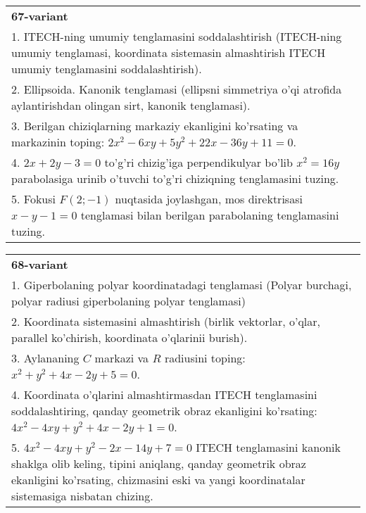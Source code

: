\documentclass{article}
\begin{document}
\begin{tabular}{m{17cm}}
\textbf{67-variant}\\
1. ITECH-ning umumiy tenglamasini soddalashtirish (ITECH-ning umumiy tenglamasi, koordinata sistemasin almashtirish ITECH umumiy tenglamasini soddalashtirish).\\

2. Ellipsoida. Kanonik tenglamasi (ellipsni simmetriya o'qi atrofida aylantirishdan olingan sirt, kanonik tenglamasi).\\

3. Berilgan chiziqlarning markaziy ekanligini ko'rsating va markazinin toping: $2x^{2}-6xy+5y^{2}+22x-36y+11=0$.\\

4. $2x + 2y - 3 = 0$ to'g'ri chizig'iga perpendikulyar bo'lib $x^{2} = 16y$ parabolasiga urinib o'tuvchi to'g'ri chiziqning tenglamasini tuzing.  \\

5. Fokusi $F(2; - 1)$ nuqtasida joylashgan, mos direktrisasi $x - y - 1 = 0$ tenglamasi bilan berilgan parabolaning tenglamasini tuzing.  
\end{tabular}
\vspace{1cm}


\begin{tabular}{m{17cm}}
\textbf{68-variant}\\
1. Giperbolaning polyar koordinatadagi tenglamasi (Polyar burchagi, polyar radiusi giperbolaning polyar tenglamasi)\\

2. Koordinata sistemasini almashtirish (birlik vektorlar, o'qlar, parallel ko'chirish, koordinata o'qlarinii burish).\\

3. Aylananing $C$ markazi va $R$ radiusini toping: $x^2+y^2+4x-2y+5=0$.\\

4. Koordinata o'qlarini almashtirmasdan ITECH tenglamasini soddalashtiring, qanday geometrik obraz ekanligini ko'rsating: $4x^{2} - 4xy + y^{2} + 4x - 2y + 1 = 0$.  \\

5. $4x^{2} - 4xy + y^{2} - 2x - 14y + 7 = 0$ ITECH tenglamasini kanonik shaklga olib keling, tipini aniqlang, qanday geometrik obraz ekanligini ko'rsating, chizmasini eski va yangi koordinatalar sistemasiga nisbatan chizing.  
\end{tabular}
\vspace{1cm}
\end{document}

